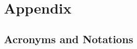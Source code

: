 \chapter{Appendix}
\label{appendix}

\section{Acronyms and Notations}
\label{sec:eval_param}

\newpage
